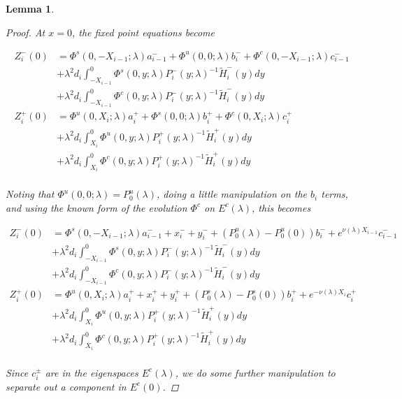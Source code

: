 \documentclass[12pt]{article}
\newtheorem{lemma}{Lemma}
\begin{document}
\begin{lemma}
\begin{proof}
At $x = 0$, the fixed point equations become

\begin{align*}
Z_i^-(0) &= \Phi^s(0, -X_{i-1}; \lambda) a_{i-1}^- + \Phi^u(0, 0; \lambda) b_i^- + \Phi^c(0, -X_{i-1}; \lambda) c_{i-1}^- \\
&+ \lambda^2 d_i \int_{-X_{i-1}}^0 \Phi^s(0, y; \lambda) P_i^-(y; \lambda)^{-1} \tilde{H}_i^-(y) dy \\
&+ \lambda^2 d_i \int_{-X_{i-1}}^0 \Phi^c(0, y; \lambda) P_i^-(y; \lambda)^{-1} \tilde{H}_i^-(y) dy  \\ 
Z_i^+(0) &= \Phi^u(0, X_i; \lambda) a_i^+ + \Phi^s(0, 0; \lambda) b_i^+ + \Phi^c(0, X_i; \lambda) c_i^+ \\
&+ \lambda^2 d_i \int_{X_i}^0 \Phi^u(0, y; \lambda) P_i^+(y; \lambda)^{-1} \tilde{H}_i^+(y) dy \\
&+ \lambda^2 d_i \int_{X_i}^0 \Phi^c(0, y; \lambda) P_i^+(y; \lambda)^{-1} \tilde{H}_i^+(y) dy \\
\end{align*}

Noting that $\Phi^u(0, 0; \lambda) = P_0^u(\lambda)$, doing a little manipulation on the $b_i$ terms, and using the known form of the evolution $\Phi^c$ on $E^c(\lambda)$, this becomes

\begin{align*}
Z_i^-(0) &= \Phi^s(0, -X_{i-1}; \lambda) a_{i-1}^- + x_i^- + y_i^- + (P_0^u(\lambda) - P_0^u(0))b_i^- + e^{\nu(\lambda) X_{i-1}} c_{i-1}^- \\
&+ \lambda^2 d_i \int_{-X_{i-1}}^0 \Phi^s(0, y; \lambda) P_i^-(y; \lambda)^{-1} \tilde{H}_i^-(y) dy \\
&+ \lambda^2 d_i \int_{-X_{i-1}}^0 \Phi^c(0, y; \lambda) P_i^-(y; \lambda)^{-1} \tilde{H}_i^-(y) dy  \\ 
Z_i^+(0) &= \Phi^u(0, X_i; \lambda) a_i^+ + x_i^+ + y_i^+ + (P_0^s(\lambda) - P_0^s(0)) b_i^+ + e^{-\nu(\lambda)X_i} c_i^+ \\
&+ \lambda^2 d_i \int_{X_i}^0 \Phi^u(0, y; \lambda) P_i^+(y; \lambda)^{-1} \tilde{H}_i^+(y) dy \\
&+ \lambda^2 d_i \int_{X_i}^0 \Phi^c(0, y; \lambda) P_i^+(y; \lambda)^{-1} \tilde{H}_i^+(y) dy \\
\end{align*}

Since $c_i^\pm$ are in the eigenspaces $E^c(\lambda)$, we do some further manipulation to separate out a component in $E^c(0)$.


\end{proof}
\end{lemma}
\end{document}
